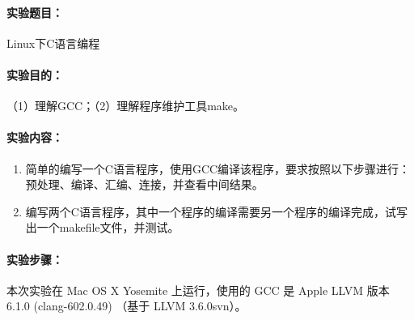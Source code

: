 \documentclass[cs4size,a4paper,nofonts]{ctexart}
\def\titlec{Linux下C语言编程}
\begin{document}




\paragraph{实验题目：}\titlec

\paragraph{实验目的：}
（1）理解GCC；（2）理解程序维护工具make。

\paragraph{实验内容：}
\begin{enumerate}
\item 简单的编写一个C语言程序，使用GCC编译该程序，要求按照以下步骤进行：预处理、编译、汇编、连接，并查看中间结果。
\item 编写两个C语言程序，其中一个程序的编译需要另一个程序的编译完成，试写出一个makefile文件，并测试。
\end{enumerate}

\paragraph{实验步骤：}\quad

\newcommand{\image}[3][width=0.9\textwidth]{
    \centering
        \texttt{[image: images/exp9/\#2.png]}
    \caption{#3}
    \label{fig:#3}
}

本次实验在 Mac OS X Yosemite 上运行，使用的 GCC 是 Apple LLVM 版本 6.1.0 (clang-602.0.49) （基于 LLVM 3.6.0svn）。
\end{document}
